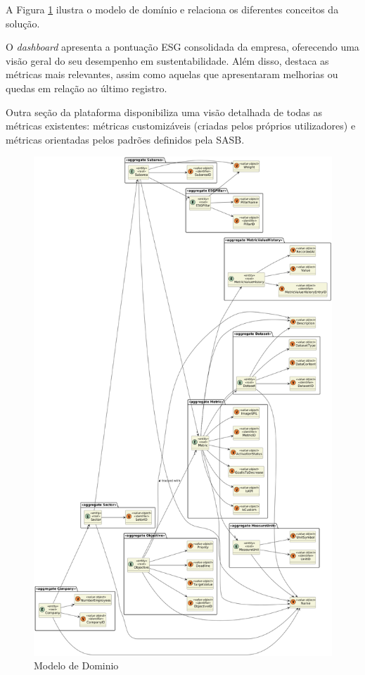 A Figura \ref{fig:domain_model} ilustra o modelo de domínio e relaciona os diferentes conceitos da solução.

O \textit{dashboard} apresenta a pontuação ESG consolidada da empresa, oferecendo uma visão geral do seu desempenho em sustentabilidade. Além disso, destaca as métricas mais relevantes, assim como aquelas que apresentaram melhorias ou quedas em relação ao último registro.

Outra seção da plataforma disponibiliza uma visão detalhada de todas as métricas existentes: métricas customizáveis (criadas pelos próprios utilizadores) e métricas orientadas pelos padrões definidos pela \gls{SASB}.

\begin{figure}[H]
    \centering
    \includegraphics[width=\linewidth,keepaspectratio]{frontmatter/assets/diagrams/Domain Model/Domain_Model2.png}
    \caption{Modelo de Dominio}
    \label{fig:domain_model}
\end{figure}

